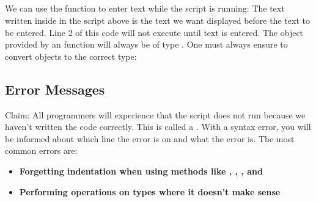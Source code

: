 \subsection{}
We can use the  function to enter text while the script is running:
The text written inside  in the script above is the text we want displayed before the text to be entered. Line 2 of this code will not execute until text is entered.
\newpage
The object provided by an  function will always be of type . One must always ensure to convert objects to the correct type:
\subsection{Error Messages}
Claim: All programmers will experience that the script does not run because we haven't written the code correctly. This is called a . With a syntax error, you will be informed about which line the error is on and what the error is. The most common errors are:
\begin{itemize}
	\item \textbf{Forgetting indentation when using methods like , , , and }
	\item \textbf{Performing operations on types where it doesn't make sense}
\end{itemize}




